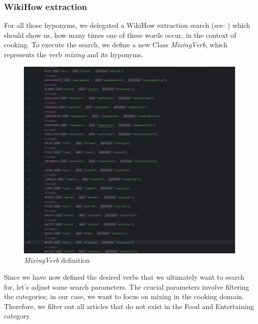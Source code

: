   \subsubsection*{WikiHow extraction}
  For all those hyponyms, we delegated a WikiHow extraction search (see: ) which should show us, how many times one of these words occur, in the context of cooking.
	To execute the search, we define a new Class \textit{MixingVerb}, which represents the verb \textit{mixing} and its hyponyms.
  \begin{figure}[H]
    \includegraphics[scale=0.4]{Graphics/MixingVerbClass.png}
    \caption{\textit{MixingVerb} definition}
    \label{fig:mixingverb WikiHow}
  \end{figure}
    Since we have now defined the desired verbs that we ultimately want to search for, let's adjust some search parameters. The crucial parameters involve filtering the categories; in our case, we want to focus on mixing in the cooking domain. Therefore, we filter out all articles that do not exist in the Food and Entertaining category.
